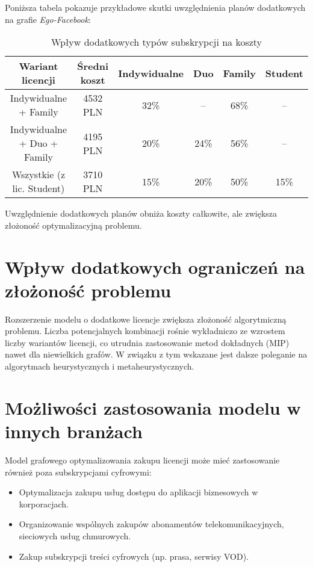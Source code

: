 Poniższa tabela pokazuje przykładowe skutki uwzględnienia planów dodatkowych na grafie \textit{Ego-Facebook}:

\begin{table}[h]
\centering
\begin{tabular}{|c|c|c|c|c|c|}
\hline
\textbf{Wariant licencji} & \textbf{Średni koszt} & \textbf{Indywidualne} & \textbf{Duo} & \textbf{Family} & \textbf{Student} \\
\hline
Indywidualne + Family & 4532 PLN & 32\% & – & 68\% & – \\
Indywidualne + Duo + Family & 4195 PLN & 20\% & 24\% & 56\% & – \\
Wszystkie (z lic. Student) & 3710 PLN & 15\% & 20\% & 50\% & 15\% \\
\hline
\end{tabular}
\caption{Wpływ dodatkowych typów subskrypcji na koszty}
\label{tab:subscription_plans}
\end{table}

Uwzględnienie dodatkowych planów obniża koszty całkowite, ale zwiększa złożoność optymalizacyjną problemu.

\section{Wpływ dodatkowych ograniczeń na złożoność problemu}

Rozszerzenie modelu o dodatkowe licencje zwiększa złożoność algorytmiczną problemu. Liczba potencjalnych kombinacji rośnie wykładniczo ze wzrostem liczby wariantów licencji, co utrudnia zastosowanie metod dokładnych (MIP) nawet dla niewielkich grafów. W związku z tym wskazane jest dalsze poleganie na algorytmach heurystycznych i metaheurystycznych.

\section{Możliwości zastosowania modelu w innych branżach}

Model grafowego optymalizowania zakupu licencji może mieć zastosowanie również poza subskrypcjami cyfrowymi:

\begin{itemize}
    \item Optymalizacja zakupu usług dostępu do aplikacji biznesowych w korporacjach.
    \item Organizowanie wspólnych zakupów abonamentów telekomunikacyjnych, sieciowych usług chmurowych.
    \item Zakup subskrypcji treści cyfrowych (np. prasa, serwisy VOD).
\end{itemize}

